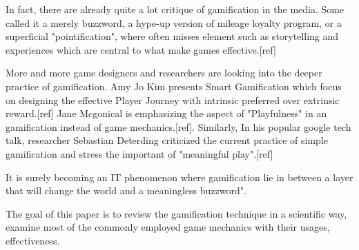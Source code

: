 In fact, there are already quite a lot critique of gamification in the media. Some called it a merely buzzword, a hype-up version of mileage loyalty program, or a superficial "pointification", where often misses element such as storytelling and experiences which are central to what make games effective.[ref]

More and more game designers and researchers are looking into the deeper practice of gamification. Amy Jo Kim presents Smart Gamification which focus on designing the effective Player Journey with intrinsic preferred over extrinsic reward.[ref] Jane Mcgonical is emphasizing the aspect of "Playfulness" in an gamification instead of game mechanics.[ref]. Similarly, In his popular google tech talk, researcher Sebastian Deterding criticized the current practice of simple gamification and stress the important of "meaningful play".[ref]

It is surely becoming an IT phenomenon where gamification lie in between a layer that will change the world and a meaningless buzzword".

The goal of this paper is to review the gamification technique in a scientific way, examine most of the commonly employed game mechanics with their usages, effectiveness. 
